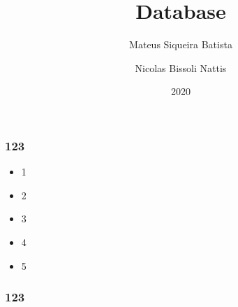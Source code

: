 \documentclass[12pt]{beamer}
\title[Database]{Database}
\author{
  Mateus Siqueira Batista\and
  Nicolas Bissoli Nattis
}
\institute{
  Instituto de Computação, UNICAMP
}
\date[2020]{2020}
\begin{document}
\frame{\titlepage}

\begin{frame}
  \frametitle{123}
  \begin{itemize}
    \item <1->\alert<1>{1}
    \item <2->\alert<2>{2}
    \item <3->\alert<3>{3}
    \item <4->\alert<4>{4}
    \item <5->\alert<5>{5}
  \end{itemize}
\end{frame}

\begin{frame}
  \frametitle{123}
  \lipsum[1]
\end{frame}
\end{document}
